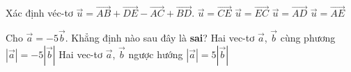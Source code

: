 \begin{ex}%
	Xác định véc-tơ $\vec{u}=\overrightarrow{AB}+\overrightarrow{DE}-\overrightarrow{AC}+\overrightarrow{BD}$.
	\choice
	{\True $\vec{u}=\overrightarrow{CE}$}
	{$\vec{u}=\overrightarrow{EC}$}
	{$\vec{u}=\overrightarrow{AD}$}
	{$\vec{u}=\overrightarrow{AE}$}
\end{ex}

\begin{ex}%
	Cho $\vec{a}=-5\vec{b}$. Khẳng định nào sau đây là \textbf{sai}?
	\choice
	{Hai vec-tơ $\vec{a}$, $\vec{b}$ cùng phương}
	{$\left|\vec{a} \right|=-5\left| \vec{b} \right|$}
	{Hai vec-tơ $\vec{a}$, $\vec{b}$ ngược hướng}
	{\True $\left|\vec{a} \right|=5\left| \vec{b} \right|$}
\end{ex}

